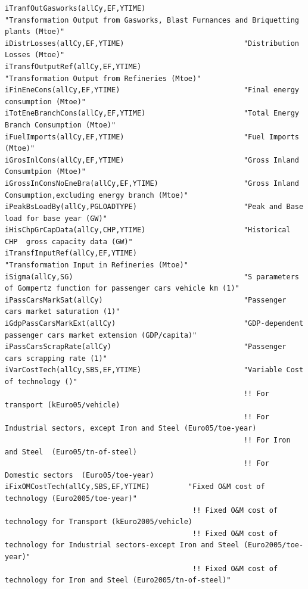 \documentclass[a4paper,]{scrartcl}
\begin{document}
\begin{lstlisting}
iTranfOutGasworks(allCy,EF,YTIME)                       "Transformation Output from Gasworks, Blast Furnances and Briquetting plants (Mtoe)"    
iDistrLosses(allCy,EF,YTIME)                            "Distribution Losses (Mtoe)"    
iTransfOutputRef(allCy,EF,YTIME)                        "Transformation Output from Refineries (Mtoe)"  
iFinEneCons(allCy,EF,YTIME)                             "Final energy consumption (Mtoe)"   
iTotEneBranchCons(allCy,EF,YTIME)                       "Total Energy Branch Consumption (Mtoe)"    
iFuelImports(allCy,EF,YTIME)                            "Fuel Imports (Mtoe)"   
iGrosInlCons(allCy,EF,YTIME)                            "Gross Inland Consumtpion (Mtoe)"   
iGrossInConsNoEneBra(allCy,EF,YTIME)                    "Gross Inland Consumption,excluding energy branch (Mtoe)"   
iPeakBsLoadBy(allCy,PGLOADTYPE)                         "Peak and Base load for base year (GW)" 
iHisChpGrCapData(allCy,CHP,YTIME)                       "Historical CHP  gross capacity data (GW)"  
iTransfInputRef(allCy,EF,YTIME)                         "Transformation Input in Refineries (Mtoe)" 
iSigma(allCy,SG)                                        "S parameters of Gompertz function for passenger cars vehicle km (1)"
iPassCarsMarkSat(allCy)                                 "Passenger cars market saturation (1)"  
iGdpPassCarsMarkExt(allCy)                              "GDP-dependent passenger cars market extension (GDP/capita)"    
iPassCarsScrapRate(allCy)                               "Passenger cars scrapping rate (1)" 
iVarCostTech(allCy,SBS,EF,YTIME)                        "Variable Cost of technology ()"
                                                        !! For transport (kEuro05/vehicle)
                                                        !! For Industrial sectors, except Iron and Steel (Euro05/toe-year)
                                                        !! For Iron and Steel  (Euro05/tn-of-steel)
                                                        !! For Domestic sectors  (Euro05/toe-year)
iFixOMCostTech(allCy,SBS,EF,YTIME)         "Fixed O&M cost of technology (Euro2005/toe-year)"                                   
                                            !! Fixed O&M cost of technology for Transport (kEuro2005/vehicle)
                                            !! Fixed O&M cost of technology for Industrial sectors-except Iron and Steel (Euro2005/toe-year)"                                            
                                            !! Fixed O&M cost of technology for Iron and Steel (Euro2005/tn-of-steel)"                                          

\end{lstlisting}
\end{document}
